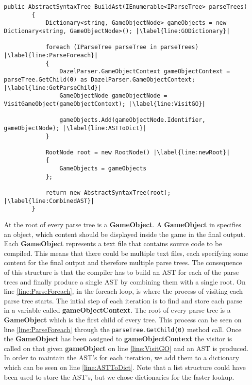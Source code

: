 \begin{lstlisting}[caption={The BuildAst method}, label={lst:BuildAstMethod},escapechar=|]
    public AbstractSyntaxTree BuildAst(IEnumerable<IParseTree> parseTrees)
        {
            Dictionary<string, GameObjectNode> gameObjects = new Dictionary<string, GameObjectNode>(); |\label{line:GODictionary}|
            
            foreach (IParseTree parseTree in parseTrees) |\label{line:ParseForeach}|
            {
                DazelParser.GameObjectContext gameObjectContext = parseTree.GetChild(0) as DazelParser.GameObjectContext; |\label{line:GetParseChild}|
                GameObjectNode gameObjectNode = VisitGameObject(gameObjectContext); |\label{line:VisitGO}|
                
                gameObjects.Add(gameObjectNode.Identifier, gameObjectNode); |\label{line:ASTToDict}|
            }

            RootNode root = new RootNode() |\label{line:newRoot}|
            {
                GameObjects = gameObjects
            };
            
            return new AbstractSyntaxTree(root); |\label{line:CombinedAST}|
        }
\end{lstlisting}

At the root of every parse tree is a \textbf{GameObject}. A \textbf{GameObject} in \dazel{} specifies an object, which content should be displayed inside the game in the final output. Each \textbf{GameObject} represents a text file that contains source code to be compiled. This means that there could be multiple text files, each specifying some content for the final output and therefore multiple parse trees. 
The consequence of this structure is that the compiler has to build an AST for each of the parse trees and finally produce a single AST by combining them with a single root. On line \ref{line:ParseForeach}, in the foreach loop, is where the process of visiting each parse tree starts. 
The intial step of each iteration is to find and store each parse in a variable called \textbf{gameObjectContext}. The root of every parse tree is a \textbf{GameObject} which is the first child of every tree. This process can be seen on line \ref{line:ParseForeach} through the \texttt{parseTree.GetChild(0)} method call.
Once the \textbf{GameObject} has been assigned to \textbf{gameObjectContext} the visitor is called on that given \textbf{gameObject} on line \ref{line:VisitGO} and an AST is produced. 
In order to maintain the AST's for each iteration, we add them to a dictionary which can be seen on line \ref{line:ASTToDict}. 
Note that a list structure could have been used to store the AST's, but we chose dictionaries for the faster lookup.

